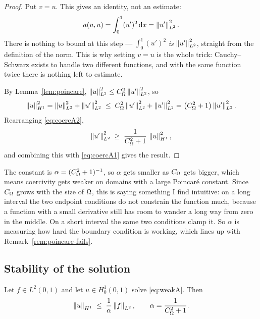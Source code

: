 \documentclass[11pt,a4paper]{article}
\begin{document}
\begin{proof}
Put $v=u$. This gives an identity, not an estimate:
\begin{equation}\label{eq:coercA1}
  a(u,u) = \int_0^1 (u')^{2} \,\mathrm{d}x = \left\lVert u' \right\rVert_{L^{2}}^{2} .
\end{equation}
There is nothing to bound at this step --- $\int_0^1 (u')^{2}$ \emph{is}
$\left\lVert u' \right\rVert_{L^{2}}^{2}$, straight from the definition of the norm. This is why setting
$v=u$ is the whole trick: Cauchy--Schwarz exists to handle two different
functions, and with the same function twice there is nothing left to estimate.

By Lemma~\ref{lem:poincare}, $\left\lVert u \right\rVert_{L^{2}}^{2} \le C_\Omega^{2}\left\lVert u' \right\rVert_{L^{2}}^{2}$, so
\begin{equation}\label{eq:coercA2}
  \left\lVert u \right\rVert_{H^{1}}^{2} = \left\lVert u \right\rVert_{L^{2}}^{2} + \left\lVert u' \right\rVert_{L^{2}}^{2}
  \;\le\; C_\Omega^{2}\left\lVert u' \right\rVert_{L^{2}}^{2} + \left\lVert u' \right\rVert_{L^{2}}^{2}
  = \left( C_\Omega^{2}+1 \right)\left\lVert u' \right\rVert_{L^{2}}^{2} .
\end{equation}
Rearranging \eqref{eq:coercA2},
\begin{equation}\label{eq:coercA3}
  \left\lVert u' \right\rVert_{L^{2}}^{2} \;\ge\; \frac{1}{C_\Omega^{2}+1}\,\left\lVert u \right\rVert_{H^{1}}^{2} ,
\end{equation}
and combining this with \eqref{eq:coercA1} gives the result.
\end{proof}

\begin{remark}
The constant is $\alpha = (C_\Omega^{2}+1)^{-1}$, so $\alpha$ gets smaller as
$C_\Omega$ gets bigger, which means coercivity gets weaker on domains with a large
Poincar\'e constant. Since $C_\Omega$ grows with the size of $\Omega$, this is saying
something I find intuitive: on a long interval the two endpoint conditions do not
constrain the function much, because a function with a small derivative still has
room to wander a long way from zero in the middle. On a short interval the same
two conditions clamp it. So $\alpha$ is measuring how hard the boundary condition
is working, which lines up with Remark~\ref{rem:poincare-fails}.
\end{remark}

\subsection{Stability of the solution}

\begin{proposition}\label{prop:stabA}
Let $f \in L^{2}(0,1)$ and let $u \in H^1_0(0,1)$ solve \eqref{eq:weakA}. Then
\[
  \left\lVert u \right\rVert_{H^{1}} \;\le\; \frac{1}{\alpha}\left\lVert f \right\rVert_{L^{2}},
  \qquad \alpha = \frac{1}{C_\Omega^{2}+1} .
\]
\end{proposition}
\end{document}
